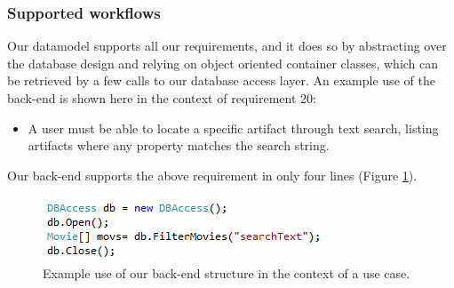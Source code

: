 \subsubsection{Supported workflows}
Our datamodel supports all our requirements, and it
does so by abstracting over the database design and relying on object oriented
container classes, which can be retrieved by a few calls to our database access
layer. An example use of the back-end is shown here in the context of requirement 20:

\begin{itemize}
\item A user must be able to locate a specific artifact through text search,
	listing artifacts where any property matches the search string.
\end{itemize}

Our back-end supports the above requirement in only four lines (Figure \ref{fig:moviesearch}).

\begin{figure}[hbt]
	\centering
	\includegraphics[scale=0.9]{./p1design/moviesearch.png}
	\caption{Example use of our back-end structure in the context of a use case.}
	\label{fig:moviesearch}
\end{figure}
